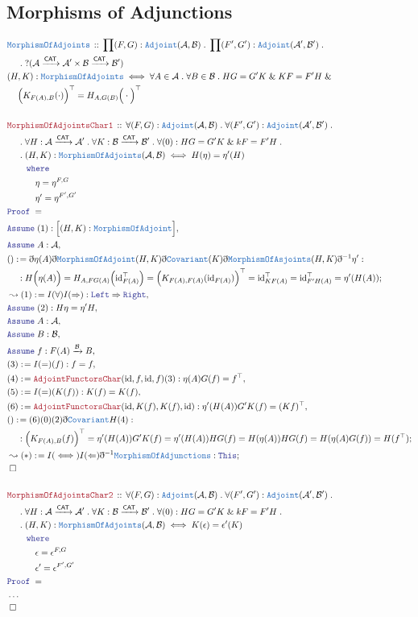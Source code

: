 \documentclass[12pt]{scrartcl}
\newcommand{\TYPE}[1]{\textcolor{NavyBlue}{\mathtt{#1}}}
\newcommand{\LOGIC}[1]{\textcolor{Blue}{\mathtt{#1}}}
\newcommand{\THM}[1]{\textcolor{Maroon}{\mathtt{#1}}}
\renewcommand{\.}{\; . \;}
\newcommand{\de}{: \kern 0.1pc =}
\newcommand{\where}{\LOGIC{where}}
\newcommand{\Theorem}[2]{& \THM{#1} \, :: \, #2 \\ & \Proof = \\ }
\newcommand{\DeclareType}[2]{& \TYPE{#1} \, :: \, #2 \\}
\newcommand{\DefineType}[3]{& #1 : \TYPE{#2} \iff #3 \\}
\newcommand{\NewLine}{\\ & \kern 1pc}
\newcommand{\Page}[1]{ \begin{align*} #1 \end{align*}   }
\newcommand{ \bd }{ \ByDef }
\newcommand{\NoProof}{ & \ldots \\ \EndProof}
\renewcommand{\And}{\; \& \;}
\DeclareMathOperator*{\id}{id}
\newcommand{\Arrow}{\xrightarrow}
\newcommand{\Say}[3]{& #1 \de #2 : #3, \\}
\newcommand{\Conclude}[3]{& #1 \de #2 : #3; \\}
\newcommand{\Derive}[3]{& \leadsto #1 \de #2 : #3, \\}
\newcommand{\DeriveConclude}[3]{& \leadsto #1 \de #2 : #3 ; \\}
\newcommand{\Assume}[2]{& \LOGIC{Assume} \; #1 : #2, \\}
\newcommand{\QED}{\; \square}
\newcommand{\EndProof}{& \QED \\}
\newcommand{\ByDef}{\eth}
\newcommand{\Proof}{\LOGIC{Proof} \; }
\newcommand{\Cov}{\TYPE{Covariant}}
\newcommand{\A}{\mathcal{A}}
\newcommand{\B}{\mathcal{B}}
\newcommand{\CAT}{\mathsf{CAT}}
\begin{document}
\subsection{Morphisms of Adjunctions}
\Page{
	\DeclareType{ MorphismOfAdjoints }{ 
		\prod (F,G) : \TYPE{Adjoint}(\A,\B) \. \prod (F',G') : \TYPE{Adjoint}(\A',\B') \.  \NewLine \. 
		?( \A \Arrow{\CAT} \A' \times \B \Arrow{\CAT} \B'   )	
	}
	\DefineType{(H,K)}{MorphismOfAdjoints}{  \forall A \in \A \. \forall B \in \B \.  
		HG = G'K \And KF = F'H  \And \NewLine 
		\Big(K_{F(A),B}(\cdot) \Big)^\top =  H_{A,G(B)}\Big( \cdot \Big)^\top  }
	\\
	\Theorem{MorphismOfAdjointsChar1}{  
			\forall (F,G) : \TYPE{Adjoint}(\A,\B) \. 
			\forall (F',G') : \TYPE{Adjoint}(\A',\B') \. \NewLine \.
			\forall H : \A \Arrow{\CAT} \A' \.
			\forall K : \B \Arrow{\CAT} \B' \.
			\forall (0) : HG = G'K \And kF = F'H   \. \NewLine \.
			(H,K) : \TYPE{MorphismOfAdjoints}(\A,\B) \iff 
			H(\eta) = \eta'(H)  \NewLine
			\quad \where \NewLine
			\quad \quad \eta = \eta^{F,G} \NewLine 
			\quad \quad \eta' = \eta^{F',G'}
		}
	\Assume{(1)}{\Big[ (H,K) : \TYPE{MorphismOfAdjoint}\Big]}
	\Assume{A}{\A}
	\Conclude{()}{ \bd \eta(A) \bd \TYPE{MorphismOfAdjoint}(H,K)\bd \Cov(K) \bd \TYPE{MorphismOfAsjoints}(H,K)\bd^{-1}\eta'}{ 
			\NewLine :
			H\Big(\eta(A)\Big) = 
			H_{A,FG(A)}\Big( {\id}^{\top}_{F(A)} \Big) =
			\Big(   K_{F(A),F(A)}({\id}_{F(A)})\Big)^\top =
			{\id}^\top_{KF(A)} =
			{\id}^\top_{F'H(A)} = 
			\eta'(H(A))
		}
	\Derive{(1)}{I(\forall)I(\Rightarrow)}{ \LOGIC{Left} \Rightarrow \LOGIC{Right} }
	\Assume{(2)}{H\eta = \eta'H}
	\Assume{A}{\A}
	\Assume{B}{\B}
	\Assume{f}{F(A) \Arrow{\B} B}
	\Say{(3)}{I(=)(f)}{f = f}
	\Say{(4)}{\THM{AdjointFunctorsChar}(\id,f,\id,f)(3)}{\eta(A)G(f) = f^\top}
	\Say{(5)}{I(=)(K(f))}{K(f) = K(f)}
	\Say{(6)}{\THM{AdjointFunctorsChar}(\id,K(f),K(f),\id)}{\eta'(H(A))G'K(f) = (Kf)^\top}
	\Conclude{()}{ (6)(0)(2)\bd \Cov H (4)    }{  \NewLine :
			\Big( K_{F(A),B}(f)  \Big)^\top  = 
			\eta'(H(A))G'K(f) = 
			\eta'(H(A))HG(f)  =
			H(\eta(A))HG(f)   =
			H( \eta(A)G(f) )   =
			H( f^\top )
		}
	\DeriveConclude{(*)}{I(\iff)I(\Leftarrow)\bd^{-1} \TYPE{MorphismOfAdjunctions}}{\LOGIC{This}}
	\EndProof
	\\
	\Theorem{MorphismOfAdjointsChar2}{  
			\forall (F,G) : \TYPE{Adjoint}(\A,\B) \. 
			\forall (F',G') : \TYPE{Adjoint}(\A',\B') \. \NewLine \.
			\forall H : \A \Arrow{\CAT} \A' \.
			\forall K : \B \Arrow{\CAT} \B' \.
			\forall (0) : HG = G'K \And kF = F'H   \. \NewLine \.
			(H,K) : \TYPE{MorphismOfAdjoints}(\A,\B) \iff 
			K(\epsilon) = \epsilon'(K)  \NewLine
			\quad \where \NewLine
			\quad \quad \epsilon = \epsilon^{F,G} \NewLine 
			\quad \quad \epsilon' = \epsilon^{F',G'}
		}
	\NoProof
}
\newpage
\end{document}
